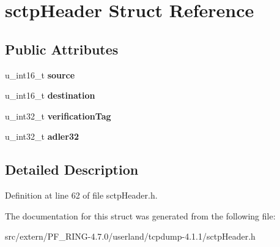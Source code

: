 \hypertarget{structsctp_header}{
\section{sctpHeader Struct Reference}
\label{structsctp_header}
}
\subsection*{Public Attributes}
\begin{DoxyCompactItemize}
\item 
\hypertarget{structsctp_header_a8a2bae560360a0595cec4ffed7903499}{
u\_\-int16\_\-t {\bfseries source}}
\label{structsctp_header_a8a2bae560360a0595cec4ffed7903499}

\item 
\hypertarget{structsctp_header_a346385f844fdf280ae78d575f0f905f5}{
u\_\-int16\_\-t {\bfseries destination}}
\label{structsctp_header_a346385f844fdf280ae78d575f0f905f5}

\item 
\hypertarget{structsctp_header_a08c15c8902391b023a847c45bf23e252}{
u\_\-int32\_\-t {\bfseries verificationTag}}
\label{structsctp_header_a08c15c8902391b023a847c45bf23e252}

\item 
\hypertarget{structsctp_header_afb557e77a1a5ee96f45e991c233efb2d}{
u\_\-int32\_\-t {\bfseries adler32}}
\label{structsctp_header_afb557e77a1a5ee96f45e991c233efb2d}

\end{DoxyCompactItemize}


\subsection{Detailed Description}


Definition at line 62 of file sctpHeader.h.



The documentation for this struct was generated from the following file:\begin{DoxyCompactItemize}
\item 
src/extern/PF\_\-RING-\/4.7.0/userland/tcpdump-\/4.1.1/sctpHeader.h\end{DoxyCompactItemize}

